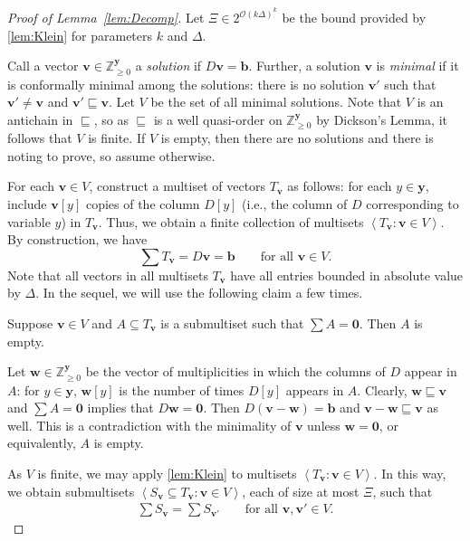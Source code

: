 \documentclass{article}
\renewcommand{\geq}{\geqslant}
\newcommand{\cfleq}{\sqsubseteq}
\newcommand{\Z}{\mathbb{Z}}
\newcommand{\Zn}{\Z_{\geq 0}}
\newcommand{\tup}[1]{{\mathbf{#1}}}
\newcommand{\ww}{\tup w}
\newcommand{\yy}{\tup y}
\newcommand{\bb}{\tup b}
\newcommand{\myvv}{\tup v} %
\newcommand{\mset}[1]{\left\langle #1\right\rangle}
\newcommand{\Oh}{{\mathcal{O}}}
\begin{document}
\begin{proof}[Proof of Lemma~\ref{lem:Decomp}]
Let $\Xi\in 2^{\Oh(k\Delta)^k}$ be the bound provided by \cref{lem:Klein} for parameters $k$ and $\Delta$.

Call a vector $\myvv\in \Zn^\yy$ a {\em{solution}} if $D\myvv=\bb$. Further, a solution $\myvv$ is {\em{minimal}} if it is conformally minimal among the solutions: there is no solution $\myvv'$ such that $\myvv'\neq \myvv$ and $\myvv'\cfleq \myvv$.
Let $V$ be the set of all minimal solutions. Note that $V$ is an antichain in $\cfleq$, so as $\cfleq$ is a well quasi-order on $\Zn^\yy$ by Dickson's Lemma, it follows that $V$ is finite. If $V$ is empty, then there are no solutions and there is noting to prove, so assume otherwise.

For each $\myvv\in V$, construct a multiset of vectors $T_\myvv$ as follows: for each $y\in \yy$, include $\myvv[y]$ copies of the column $D[y]$ (i.e., the column of $D$ corresponding to variable $y$) in $T_\myvv$. Thus, we obtain a finite collection of multisets $\mset{T_\myvv\colon \myvv\in V}$. By construction, we have
$$\sum T_\myvv = D\myvv=\bb\qquad\textrm{for all }\myvv\in V.$$
Note that all vectors in all multisets $T_\myvv$ have all entries bounded in absolute value by $\Delta$. In the sequel, we will use the following claim a few times.

\begin{techclaim}\label{cl:minimal}
    Suppose $\myvv\in V$ and $A\subseteq T_\myvv$ is a submultiset such that $\sum A=\mathbf{0}$. Then $A$ is empty.
\end{techclaim}
\begin{subproof}
    Let $\ww\in \Zn^\yy$ be the vector of multiplicities in which the columns of $D$ appear in $A$: for $y\in \yy$, $\ww[y]$ is the number of times $D[y]$ appears in $A$. Clearly, $\ww\cfleq \myvv$ and $\sum A=\mathbf{0}$ implies that $D\ww=\mathbf{0}$. Then $D(\myvv-\ww)=\bb$ and $\myvv-\ww\cfleq \myvv$ as well. This is a contradiction with the minimality of $\myvv$ unless $\ww=\mathbf{0}$, or equivalently, $A$ is empty.
\end{subproof}


As $V$ is finite, we may apply \cref{lem:Klein} to multisets $\mset{T_\myvv\colon \myvv\in V}$. In this way, we obtain submultisets $\mset{S_\myvv\subseteq T_\myvv\colon \myvv\in V}$, each of size at most $\Xi$,
such that
\begin{align*}
    \sum S_\myvv = \sum S_{\myvv'}\qquad \textrm{for all }\myvv,\myvv'\in V.
\end{align*}


\end{proof}
\end{document}
